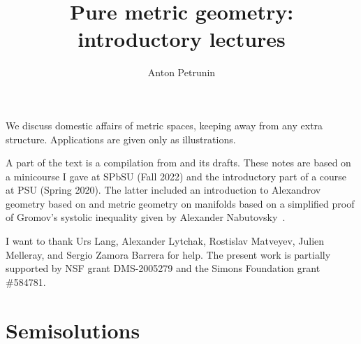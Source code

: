 \documentclass[twoside]{book}
\begin{document}

 
\title{Pure metric geometry:\\
introductory lectures}
\author{Anton Petrunin}
\date{}
\maketitle

We discuss domestic affairs of metric spaces,
keeping away from any extra structure. 
Applications are given only as illustrations.

A part of the text is a compilation from \cite{alexander-kapovitch-petrunin-2019, alexander-kapovitch-petrunin-2025, petrunin-yashinski, petrunin-2022-PIGTIKAL, petrunin-zamorabarrera} and its drafts.
These notes are based on a minicourse I gave at SPbSU (Fall 2022) and the introductory part of a course at PSU (Spring 2020).
The latter included an introduction to Alexandrov geometry based on \cite{alexander-kapovitch-petrunin-2019} and metric geometry on manifolds \cite{petrunin2020mnfld} based on a simplified proof of Gromov's systolic inequality given by Alexander Nabutovsky~\cite{nabutovsky}.

I want to thank
Urs Lang,
Alexander Lytchak,
Rostislav Matveyev,
Julien Melleray,
and Sergio Zamora Barrera for help.
The present work is partially supported by NSF grant DMS-2005279
and the Simons Foundation grant \#584781.

\thispagestyle{empty}
\tableofcontents
\thispagestyle{empty}






%

\backmatter

\chapter{Semisolutions}

{

\footnotesize
\begin{multicols}{2}







\end{multicols}
}


{\small\sloppy


\def\emph{\textit}

\printbibliography[heading=bibintoc]
\fussy
}
\end{document}
